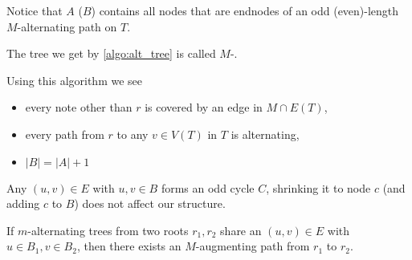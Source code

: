 Notice that $A$ ($B$) contains all nodes that are endnodes of an odd (even)-length $M$-alternating path on $T$.
\begin{definition}
    The tree we get by \autoref{algo:alt_tree} is called $M$-.
\end{definition}
\begin{observe} Using this algorithm we see
    \begin{itemize}
        \item every note other than $r$ is covered by an edge in $M \cap E(T)$,
        \item every path from $r$ to any $v \in V(T)$ in $T$ is alternating,
        \item $|B|=|A|+1$
    \end{itemize}
\end{observe}
Any $(u,v) \in E$ with $u,v \in B$ forms an odd cycle $C$, shrinking it to node $c$
(and adding $c$ to $B$) does not affect our structure.

If $m$-alternating trees from two roots $r_1, r_2$ share an $(u,v) \in E$ with
$u \in B_1, v \in B_2$, then there exists an $M$-augmenting path from $r_1$ to $r_2$.